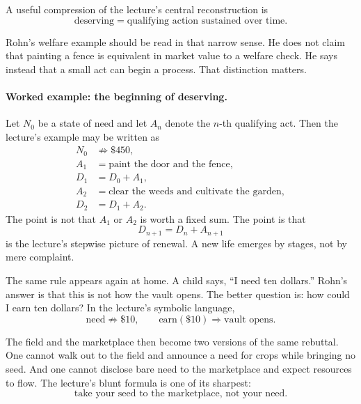 A useful compression of the lecture's central reconstruction is
\begin{equation}
\text{deserving}=\text{qualifying action sustained over time}.
\end{equation}

Rohn's welfare example should be read in that narrow sense. He does not claim that painting a fence is equivalent in market value to a welfare check. He says instead that a small act can begin a process. That distinction matters.

\paragraph{Worked example: the beginning of deserving.}
Let \(N_0\) be a state of need and let \(A_n\) denote the \(n\)-th qualifying act. Then the lecture's example may be written as
\begin{align}
N_0 &\not\Rightarrow \$450, \\
A_1 &= \text{paint the door and the fence}, \\
D_1 &= D_0 + A_1, \\
A_2 &= \text{clear the weeds and cultivate the garden}, \\
D_2 &= D_1 + A_2.
\end{align}
The point is not that \(A_1\) or \(A_2\) is worth a fixed sum. The point is that
\begin{equation}
D_{n+1}=D_n + A_{n+1}
\end{equation}
is the lecture's stepwise picture of renewal. A new life emerges by stages, not by mere complaint.

The same rule appears again at home. A child says, ``I need ten dollars.'' Rohn's answer is that this is not how the vault opens. The better question is: how could I earn ten dollars? In the lecture's symbolic language,
\begin{equation}
\text{need} \not\Rightarrow \$10, \qquad \text{earn}(\$10) \Rightarrow \text{vault opens}.
\end{equation}

The field and the marketplace then become two versions of the same rebuttal. One cannot walk out to the field and announce a need for crops while bringing no seed. And one cannot disclose bare need to the marketplace and expect resources to flow. The lecture's blunt formula is one of its sharpest:
\begin{equation}
\text{take your seed to the marketplace, not your need}.
\end{equation}

